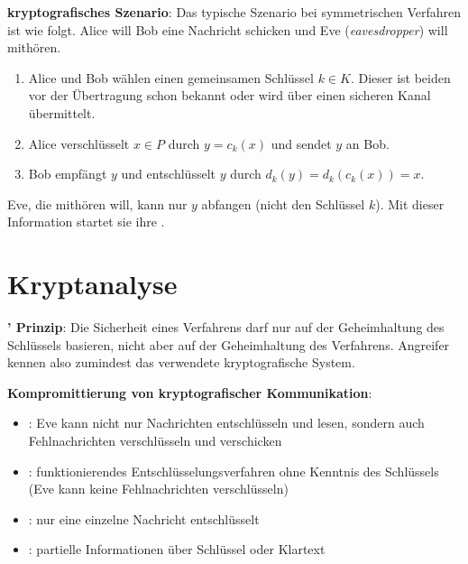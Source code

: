 \textbf{kryptografisches Szenario}:
Das typische Szenario bei symmetrischen Verfahren ist wie folgt.
Alice will Bob eine Nachricht schicken und Eve (\emph{eavesdropper}) will mithören.
\begin{enumerate}
    \item
    Alice und Bob wählen einen gemeinsamen Schlüssel $k \in K$.
    Dieser ist beiden vor der Übertragung schon bekannt oder wird über einen
    sicheren Kanal übermittelt.

    \item
    Alice verschlüsselt $x \in P$ durch $y = c_k(x)$ und sendet $y$ an Bob.

    \item
    Bob empfängt $y$ und entschlüsselt $y$ durch $d_k(y) = d_k(c_k(x)) = x$.
\end{enumerate}
Eve, die mithören will, kann nur $y$ abfangen (nicht den Schlüssel $k$).
Mit dieser Information startet sie ihre .

\pagebreak

\section{%
    Kryptanalyse%
}

\textbf{' Prinzip}:
Die Sicherheit eines Verfahrens darf nur auf der Geheimhaltung des Schlüssels basieren,
nicht aber auf der Geheimhaltung des Verfahrens.
Angreifer kennen also zumindest das verwendete kryptografische System.

\linie

\textbf{Kompromittierung von kryptografischer Kommunikation}:
\begin{itemize}
    \item
    :
    Eve kann nicht nur Nachrichten entschlüsseln und lesen, sondern auch
    Fehlnachrichten verschlüsseln und verschicken

    \item
    :
    funktionierendes Entschlüsselungsverfahren ohne Kenntnis des Schlüssels\\
    (Eve kann keine Fehlnachrichten verschlüsseln)

    \item
    :
    nur eine einzelne Nachricht entschlüsselt

    \item
    :
    partielle Informationen über Schlüssel oder Klartext
\end{itemize}

